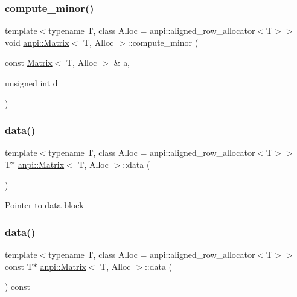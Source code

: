 \subsubsection{\texorpdfstring{compute\+\_\+minor()}{compute\_minor()}}
{\footnotesize\ttfamily template$<$typename T, class Alloc = anpi\+::aligned\+\_\+row\+\_\+allocator$<$\+T$>$$>$ \\
void \hyperlink{classanpi_1_1Matrix}{anpi\+::\+Matrix}$<$ T, Alloc $>$\+::compute\+\_\+minor (\begin{DoxyParamCaption}\item[{const \hyperlink{classanpi_1_1Matrix}{Matrix}$<$ T, Alloc $>$ \&}]{a,  }\item[{unsigned int}]{d }\end{DoxyParamCaption})}

\mbox{\label{classanpi_1_1Matrix_ae5c95a5664b8e29ead8227b3fc279d20}} 
\subsubsection{\texorpdfstring{data()}{data()}\hspace{0.1cm}{\footnotesize\ttfamily [1/2]}}
{\footnotesize\ttfamily template$<$typename T, class Alloc = anpi\+::aligned\+\_\+row\+\_\+allocator$<$\+T$>$$>$ \\
T$\ast$ \hyperlink{classanpi_1_1Matrix}{anpi\+::\+Matrix}$<$ T, Alloc $>$\+::data (\begin{DoxyParamCaption}{ }\end{DoxyParamCaption})\hspace{0.3cm}{\ttfamily [inline]}}

Pointer to data block \mbox{\label{classanpi_1_1Matrix_a326c01e733447563d4b1339d7fb7f07b}} 
\subsubsection{\texorpdfstring{data()}{data()}\hspace{0.1cm}{\footnotesize\ttfamily [2/2]}}
{\footnotesize\ttfamily template$<$typename T, class Alloc = anpi\+::aligned\+\_\+row\+\_\+allocator$<$\+T$>$$>$ \\
const T$\ast$ \hyperlink{classanpi_1_1Matrix}{anpi\+::\+Matrix}$<$ T, Alloc $>$\+::data (\begin{DoxyParamCaption}{ }\end{DoxyParamCaption}) const\hspace{0.3cm}{\ttfamily [inline]}}

